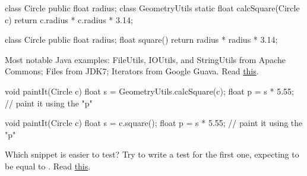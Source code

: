 \documentclass{article}
\begin{document}

\pptToc


\begin{pptWide}{2}
{\small\begin{ffcode}
class Circle {
  public float radius;
}
class GeometryUtils {
  static float calcSquare(Circle c) {
    return c.radius * c.radius * 3.14;
  }
}
\end{ffcode}
}
\par\columnbreak\par
{\small\begin{ffcode}
class Circle {
  public float radius;
  float square() {
    return radius * radius * 3.14;
  }
}
\end{ffcode}
}
\end{pptWide}
\par
Most notable Java examples:
FileUtils, IOUtils, and StringUtils from Apache Commons;
Files from JDK7;
Iterators from Google Guava.
Read \href{https://www.yegor256.com/2015/02/20/utility-classes-vs-functional-programming.html}{this}.
\plush{}


\begin{pptWide}{2}
{\small\begin{ffcode}
void paintIt(Circle c) {
  float s = GeometryUtils.calcSquare(c);
  float p = s * 5.55;
  // paint it using the "p"
}
\end{ffcode}
}
\par\columnbreak\par
{\small\begin{ffcode}
void paintIt(Circle c) {
  float s = c.square();
  float p = s * 5.55;
  // paint it using the "p"
}
\end{ffcode}
}
\end{pptWide}
\par
Which snippet is easier to test? Try to write a test for the first one, expecting  to be equal to .
Read \href{https://www.yegor256.com/2014/05/05/oop-alternative-to-utility-classes.html}{this}.
\plush{}
\end{document}
